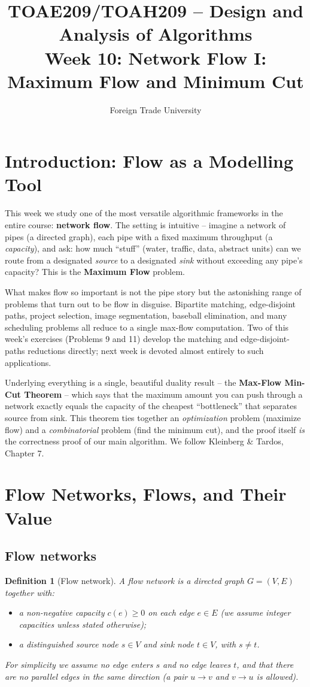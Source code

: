 \documentclass[11pt]{article}
\title{TOAE209/TOAH209 -- Design and Analysis of Algorithms\\[4pt]
\large Week 10: Network Flow I: Maximum Flow and Minimum Cut}
\author{Foreign Trade University}
\date{}
\newtheorem{definition}[theorem]{Definition}
\begin{document}
\maketitle
\tableofcontents

\section{Introduction: Flow as a Modelling Tool}

This week we study one of the most versatile algorithmic frameworks in the entire course:
\textbf{network flow}. The setting is intuitive -- imagine a network of pipes (a directed
graph), each pipe with a fixed maximum throughput (a \emph{capacity}), and ask: how much
``stuff'' (water, traffic, data, abstract units) can we route from a designated
\emph{source} to a designated \emph{sink} without exceeding any pipe's capacity? This is
the \textbf{Maximum Flow} problem.

What makes flow so important is not the pipe story but the astonishing range of problems
that turn out to be flow in disguise. Bipartite matching, edge-disjoint paths, project
selection, image segmentation, baseball elimination, and many scheduling problems all
reduce to a single max-flow computation. Two of this week's exercises (Problems 9 and 11)
develop the matching and edge-disjoint-paths reductions directly; next week is devoted
almost entirely to such applications.

Underlying everything is a single, beautiful duality result -- the \textbf{Max-Flow
Min-Cut Theorem} -- which says that the maximum amount you can push through a network
exactly equals the capacity of the cheapest ``bottleneck'' that separates source from
sink. This theorem ties together an \emph{optimization} problem (maximize flow) and a
\emph{combinatorial} problem (find the minimum cut), and the proof itself \emph{is} the
correctness proof of our main algorithm. We follow Kleinberg \& Tardos, Chapter 7.

\section{Flow Networks, Flows, and Their Value}

\subsection{Flow networks}

\begin{definition}[Flow network]
A \emph{flow network} is a directed graph $G = (V, E)$ together with:
\begin{itemize}
    \item a non-negative \emph{capacity} $c(e) \ge 0$ on each edge $e \in E$ (we assume
    integer capacities unless stated otherwise);
    \item a distinguished \emph{source} node $s \in V$ and \emph{sink} node $t \in V$,
    with $s \ne t$.
\end{itemize}
For simplicity we assume no edge enters $s$ and no edge leaves $t$, and that there are no
parallel edges in the same direction (a pair $u \to v$ and $v \to u$ is allowed).
\end{definition}
\end{document}
